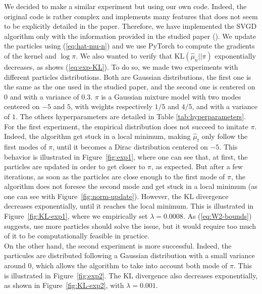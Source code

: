 \documentclass{article}
\newcommand{\KL}{\mathrm{KL}}
\begin{document}
We decided to make a similar experiment but using our own code.
Indeed, the original code is rather complex and implements
many features that does not seem to be explicitly detailed in the paper.
Therefore, we have implemented the SVGD algorithm only with the information
provided in the studied paper (\cite{main-paper}).
We update the particles using (\ref{eq:hat-mu-n}) and
we use PyTorch to compute the gradients of the kernel and $\log \pi$.
We also wanted to verify that $\KL(\hat{\mu}_n || \pi)$ exponentially
decreases, as shows (\ref{eq:exp-KL}).
To do so, we made two experiments with different particles
distributions. Both are Gaussian distributions, the first one
is the same as the one used in the studied paper, and the second one
is centered on $0$ and with a variance of $0.3$.
$\pi$ is a Gaussian mixture model with two modes centered on $-5$ and $5$,
with weights respectively $1/5$ and $4/5$, and with a variance of $1$.
The others hyperparameters are detailed in Table \ref{tab:hyperparameters}.\\

For the first experiment,
the empirical distribution does not succeed to imitate $\pi$.
Indeed, the algorithm get stuck in a local minimum, making $\hat{\mu}_t$
only follow the first modes of $\pi$, until it becomes a Dirac distribution
centered on $-5$.
This behavior is illustrated in Figure~\ref{fig:exp1}, where
one can see that, at first, the particles are updated in order
to get closer to $\pi$, as expected. But after a few iterations,
as soon as the particles are close enough to the first mode of $\pi$,
the algorithm does not foresee the second mode and get stuck in a local minimum
(as one can see with Figure~\ref{fig:norm-update}).
However, the $\KL$ divergence decreases exponentially, until it reaches
the local minimum. This is illustrated in Figure~\ref{fig:KL-exp1},
where we empirically set $\lambda = 0.0008$.
As (\ref{eq:W2-bounds}) suggests, use more particles
should solve the issue, but it would require too much of it to be
computationally feasible in practice.\\

On the other hand, the second experiment is more successful.
Indeed, the particules are distributed following a Gaussian distribution
with a small variance around $0$, which allows the algorithm
to take into account both mode of $\pi$. This is illustrated in
Figure~\ref{fig:exp2}. The $\KL$ divergence also decreases exponentially,
as shown in Figure~\ref{fig:KL-exp2}, with $\lambda = 0.001$.
\end{document}
